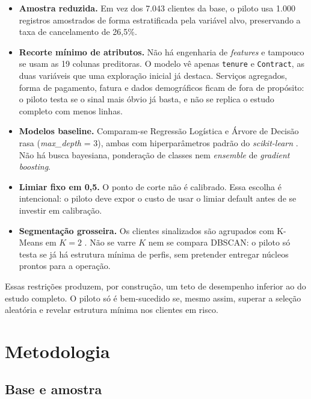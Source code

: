\documentclass[12pt]{article}
\begin{document}
\begin{itemize}
  \item \textbf{Amostra reduzida.} Em vez dos 7.043 clientes da base, o
        piloto usa 1.000 registros amostrados de forma estratificada pela
        variável alvo, preservando a taxa de cancelamento de 26,5\%.
  \item \textbf{Recorte mínimo de atributos.} Não há engenharia de
        \textit{features} e tampouco se usam as 19 colunas preditoras. O
        modelo vê apenas \texttt{tenure} e \texttt{Contract}, as duas
        variáveis que uma exploração inicial já destaca. Serviços agregados,
        forma de pagamento, fatura e dados demográficos ficam de fora de
        propósito: o piloto testa se o sinal mais óbvio já basta, e não se
        replica o estudo completo com menos linhas.
  \item \textbf{Modelos baseline.} Comparam-se Regressão Logística e Árvore
        de Decisão rasa (\textit{max\_depth} = 3), ambas com hiperparâmetros
        padrão do \textit{scikit-learn} \cite{pedregosa2011}. Não há busca
        bayesiana, ponderação de classes nem \textit{ensemble} de
        \textit{gradient boosting}.
  \item \textbf{Limiar fixo em 0,5.} O ponto de corte não é calibrado. Essa
        escolha é intencional: o piloto deve expor o custo de usar o limiar
        default antes de se investir em calibração.
  \item \textbf{Segmentação grosseira.} Os clientes sinalizados são
        agrupados com K-Means em $K = 2$ \cite{arthur2007}. Não se varre $K$
        nem se compara DBSCAN: o piloto só testa se já há estrutura mínima
        de perfis, sem pretender entregar núcleos prontos para a operação.
\end{itemize}

Essas restrições produzem, por construção, um teto de desempenho inferior ao
do estudo completo. O piloto só é bem-sucedido se, mesmo assim, superar a
seleção aleatória e revelar estrutura mínima nos clientes em risco.

\section{Metodologia}
\label{sec:3}

\subsection{Base e amostra}
\end{document}
